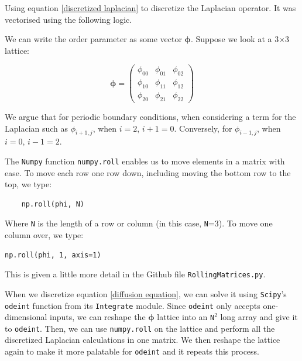 \documentclass{article}
\begin{document}
Using equation \ref{discretized laplacian} to discretize the Laplacian operator. It was vectorised using the following logic.

\medskip

We can write the order parameter as some vector $\boldsymbol{\phi}$. Suppose we look at a 3$\times$3 lattice:

\begin{equation}
	\boldsymbol{\phi} = \begin{pmatrix}
	\phi_{00} & \phi_{01} & \phi_{02}\\
	\phi_{10} & \phi_{11} & \phi_{12}\\
	\phi_{20} & \phi_{21} & \phi_{22}
	\end{pmatrix}
\end{equation}

We argue that for periodic boundary conditions, when considering a term for the Laplacian such as $\phi_{i+1,j}$, when $i=2$, $i+1=0$. Conversely, for $\phi_{i-1,j}$, when $i=0$, $i-1=2$.

The \texttt{Numpy} function \texttt{numpy.roll} enables us to move elements in a matrix with ease. To move each row one row down, including moving the bottom row to the top, we type:

\begin{verbatim}
	np.roll(phi, N)
\end{verbatim}

Where \texttt{N} is the length of a row or column (in this case, \texttt{N}=3). To move one column over, we type:

\begin{verbatim}
np.roll(phi, 1, axis=1)
\end{verbatim}

This is given a little more detail in the Github file \texttt{RollingMatrices.py}.

\medskip

When we discretize equation \ref{diffusion equation}, we can solve it using \texttt{Scipy}'s \texttt{odeint} function from its \texttt{Integrate} module. Since \texttt{odeint} only accepts one-dimensional inputs, we can reshape the $\boldsymbol{\phi}$ lattice into an \texttt{N}$^{2}$ long array and give it to \texttt{odeint}. Then, we can use \texttt{numpy.roll} on the lattice and perform all the discretized Laplacian calculations in one matrix. We then reshape the lattice again to make it more palatable for \texttt{odeint} and it repeats this process.

\medskip
\end{document}
